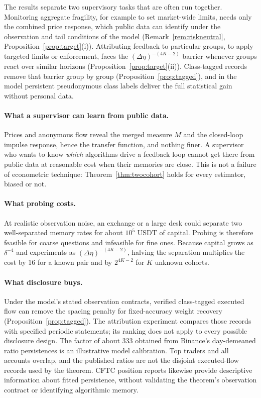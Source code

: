 The results separate two supervisory tasks that are often run together. Monitoring aggregate fragility, for example to set market-wide limits, needs only the combined price response, which public data can identify under the observation and tail conditions of the model (Remark~\ref{rem:riskneutral}, Proposition~\ref{prop:target}(i)). Attributing feedback to particular groups, to apply targeted limits or enforcement, faces the $(\Delta\eta)^{-(4K-2)}$ barrier whenever groups react over similar horizons (Proposition~\ref{prop:target}(ii)). Class-tagged records remove that barrier group by group (Proposition~\ref{prop:tagged}), and in the model persistent pseudonymous class labels deliver the full statistical gain without personal data.


\paragraph{What a supervisor can learn from public data.} Prices and anonymous flow reveal the merged measure $M$ and the closed-loop impulse response, hence the transfer function, and nothing finer. A supervisor who wants to know \emph{which} algorithms drive a feedback loop cannot get there from public data at reasonable cost when their memories are close. This is not a failure of econometric technique: Theorem~\ref{thm:twocohort} holds for every estimator, biased or not.

\paragraph{What probing costs.} At realistic observation noise, an exchange or a large desk could separate two well-separated memory rates for about $10^5$ USDT of capital. Probing is therefore feasible for coarse questions and infeasible for fine ones. Because capital grows as $\delta^{-4}$ and experiments as $(\Delta\eta)^{-(4K-2)}$, halving the separation multiplies the cost by 16 for a known pair and by $2^{4K-2}$ for $K$ unknown cohorts.

\paragraph{What disclosure buys.} Under the model's stated observation contracts, verified class-tagged executed flow can remove the spacing penalty for fixed-accuracy weight recovery (Proposition~\ref{prop:tagged}). The attribution experiment compares those records with specified periodic statements; its ranking does not apply to every possible disclosure design. The factor of about 333 obtained from Binance's day-demeaned ratio persistences is an illustrative model calibration. Top traders and all accounts overlap, and the published ratios are not the disjoint executed-flow records used by the theorem. CFTC position reports likewise provide descriptive information about fitted persistence, without validating the theorem's observation contract or identifying algorithmic memory.

